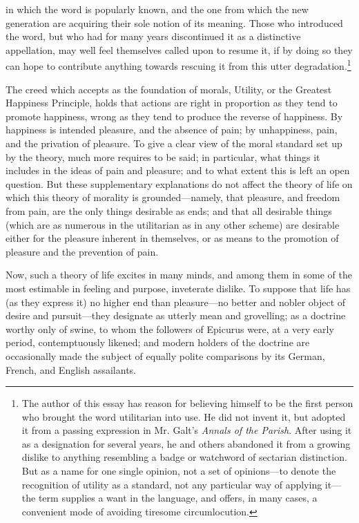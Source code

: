 in which the word is popularly known, and the one from which the new
generation are acquiring their sole notion of its meaning. Those who
introduced the word, but who had for many years discontinued it as a
distinctive appellation, may well feel themselves called upon to
resume it, if by doing so they can hope to contribute anything towards
rescuing it from this utter degradation.\footnote{The author of this
essay has reason for believing himself to be the first person who
brought the word utilitarian into use. He did not invent it, but
adopted it from a passing expression in Mr. Galt's \textit{Annals of
the Parish}. After using it as a designation for several years, he and
others abandoned it from a growing dislike to anything resembling a
badge or watchword of sectarian distinction. But as a name for one
single opinion, not a set of o\-pin\-ions---to denote the recognition
of utility as a standard, not any particular way of applying it---the
term supplies a want in the language, and offers, in many cases, a
convenient mode of avoiding tiresome circumlocution.}

The creed which accepts as the foundation of morals, Utility, or the
Greatest Happiness Principle, holds that actions are right in
proportion as they tend to promote happiness, wrong as they tend to
produce the  reverse of happiness. By happiness is intended
pleasure, and the absence of pain; by unhappiness, pain, and the
privation of pleasure. To give a clear view of the moral standard set
up by the theory, much more requires to be said; in particular, what
things it includes in the ideas of pain and pleasure; and to what
extent this is left an open question. But these supplementary
explanations do not affect the theory of life on which this theory of
morality is ground\-ed---name\-ly, that pleasure, and freedom from
pain, are the only things desirable as ends; and that all desirable
things (which are as numerous in the utilitarian as in any other
scheme) are desirable either for the pleasure inherent in themselves,
or as means to the promotion of pleasure and the prevention of pain.

Now, such a theory of life excites in many minds, and among them in
some of the most estimable in feeling and purpose, inveterate dislike.
To suppose that life has (as they express it) no higher end than
pleas\-ure---no better and nobler object of desire and
pur\-suit---they designate as utterly mean and grovelling; as a
doctrine worthy only of swine, to whom the followers of Epicurus were,
at a very early period, contemptuously likened; and modern holders of
the doctrine are occasionally made the subject of equally polite
comparisons by its German, French, and English assailants.

